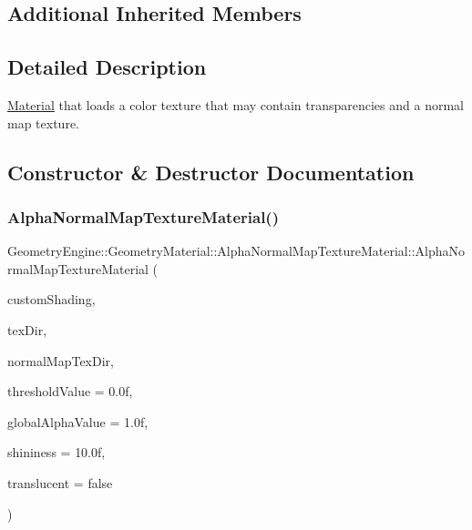 \subsection*{Additional Inherited Members}


\subsection{Detailed Description}
\mbox{\hyperlink{class_geometry_engine_1_1_geometry_material_1_1_material}{Material}} that loads a color texture that may contain transparencies and a normal map texture. 

\subsection{Constructor \& Destructor Documentation}
\mbox{\label{class_geometry_engine_1_1_geometry_material_1_1_alpha_normal_map_texture_material_ae09aba3281b21c239ad7c7391859b510}} 
\subsubsection{\texorpdfstring{AlphaNormalMapTextureMaterial()}{AlphaNormalMapTextureMaterial()}\hspace{0.1cm}{\footnotesize\ttfamily [1/2]}}
{\footnotesize\ttfamily Geometry\+Engine\+::\+Geometry\+Material\+::\+Alpha\+Normal\+Map\+Texture\+Material\+::\+Alpha\+Normal\+Map\+Texture\+Material (\begin{DoxyParamCaption}\item[{const \mbox{\hyperlink{class_geometry_engine_1_1_custom_shading_1_1_custom_shading_interface}{Custom\+Shading\+::\+Custom\+Shading\+Interface}} $\ast$const}]{custom\+Shading,  }\item[{const std\+::string \&}]{tex\+Dir,  }\item[{const std\+::string \&}]{normal\+Map\+Tex\+Dir,  }\item[{float}]{threshold\+Value = {\ttfamily 0.0f},  }\item[{float}]{global\+Alpha\+Value = {\ttfamily 1.0f},  }\item[{float}]{shininess = {\ttfamily 10.0f},  }\item[{bool}]{translucent = {\ttfamily false} }\end{DoxyParamCaption})}

